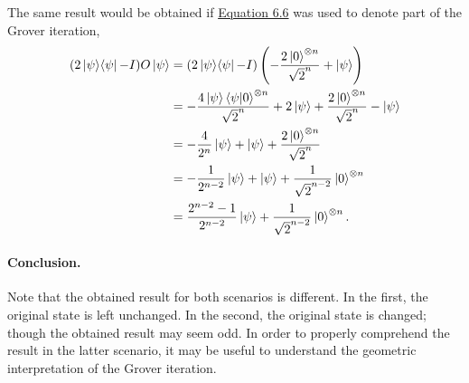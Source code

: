 The same result would be obtained if \hyperref[sec:nielsen-and-chuang-equation-6-6]{Equation 6.6}
was used to denote part of the Grover iteration,
\begin{align}
    (2\mathop{\mathinner{ |{\psi}\rangle \langle{\psi}|}} - I)O \ket\psi &=
        (2\mathop{\mathinner{ |{\psi}\rangle \langle{\psi}|}} - I) \left(- \frac{2\ket{0}^{\otimes n}}{\sqrt{2}^n} + \ket\psi \right) \\
    &= - \frac{4 \ket\psi \mathop{\mathinner{ \langle{\psi}|{0}\rangle}}^{\otimes n}}{\sqrt{2}^n} + 2 \ket\psi +
        \frac{2 \ket{0}^{\otimes n}}{\sqrt{2}^n} - \ket\psi \\
    &= - \frac{4}{2^n}\ket\psi + \ket\psi + \frac{2 \ket{0}^{\otimes n}}{\sqrt{2}^n} \\
    &= - \frac{1}{2^{n - 2}}\ket\psi + \ket\psi + \frac{1}{\sqrt{2}^{n - 2}} \ket{0}^{\otimes n} \\
    &= \frac{2^{n - 2} - 1}{2^{n - 2}}\ket\psi + \frac{1}{\sqrt{2}^{n - 2}} \ket{0}^{\otimes n}.
\end{align}

\paragraph{Conclusion.}
Note that the obtained result for both scenarios is different.
In the first, the original state is left unchanged.
In the second, the original state is changed;
though the obtained result may seem odd.
In order to properly comprehend the result in the latter scenario,
it may be useful to understand the geometric interpretation of
the Grover iteration.


